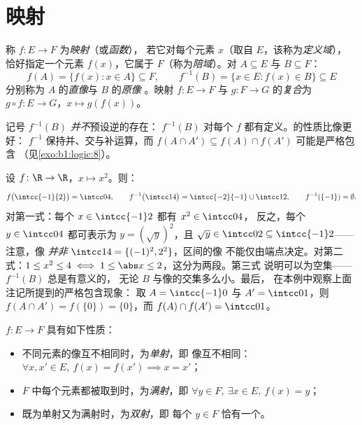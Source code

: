 \section{映射}

\begin{definition}[映射、像、原像]\label{def:b1:logic:map}
称 $f \colon E \to F$ 为\emph{映射}（或\emph{函数}），
若它对每个元素 $x$（取自 $E$，该称为\emph{定义域}），
恰好指定一个元素 $f(x)$，它属于 $F$（称为\emph{陪域}）。对 $A
\subseteq E$ 与 $B \subseteq F$：
\[
f(A) = \{f(x) : x \in A\} \subseteq F,
\qquad
f^{-1}(B) = \{x \in E : f(x) \in B\} \subseteq E
\]
分别称为 $A$ 的\emph{直像}与 $B$ 的\emph{原像}
。映射 $f \colon E \to F$ 与
$g \colon F \to G$ 的\emph{复合}为 $g \circ f \colon E \to G$，$x \mapsto
g(f(x))$。
\end{definition}

\begin{remark}
记号 $f^{-1}(B)$ \emph{并不}预设逆的存在：
$f^{-1}(B)$ 对每个 $f$ 都有定义。的性质比像更好：
$f^{-1}$ 保持并、交与补运算，而
$f(A \cap A') \subseteq f(A) \cap f(A')$ 可能是严格包含
（见\cref{exo:b1:logic:8}）。
\end{remark}

\begin{example}[计算像与原像]\label{ex:b1:logic:images}
设 $f \colon \R \to \R$，$x \mapsto x^2$。则：
\[
f\bigl(\intcc{-1}{2}\bigr) = \intcc04, \qquad
f^{-1}\bigl(\intcc14\bigr) = \intcc{-2}{-1} \cup \intcc12, \qquad
f^{-1}(\{-1\}) = \emptyset .
\]
对第一式：每个 $x \in \intcc{-1}2$ 都有 $x^2 \in \intcc04$，
反之，每个 $y \in \intcc04$ 都可表示为 $y = (\sqrt y)^2$，且 $\sqrt y
\in \intcc02 \subseteq \intcc{-1}2$——注意，像
\emph{并非} $\intcc14 = \{(-1)^2, 2^2\}$，区间的像
不能仅由端点决定。对第二式：$1 \leq x^2 \leq 4 \iff
1 \leq \abs x \leq 2$，这分为两段。第三式
说明可以为空集——$f^{-1}(B)$ 总是有意义的，
无论 $B$ 与像的交集多么小。最后，
在本例中观察上面注记所提到的严格包含现象：
取 $A = \intcc{-1}0$ 与 $A' = \intcc01$，则 $f(A \cap A') =
f(\{0\}) = \{0\}$，而 $f(A) \cap f(A') = \intcc01$。
\end{example}

\begin{definition}[单射、满射、双射]\label{def:b1:logic:inj}
 $f \colon E \to F$ 具有如下性质：
\begin{itemize}
  \item 不同元素的像互不相同时，为\emph{单射}，即
        像互不相同： $\forall x, x' \in E,\ f(x) = f(x') \implies
        x = x'$；
  \item $F$ 中每个元素都被取到时，为\emph{满射}，即
        $\forall y \in F,\ \exists x \in E,\ f(x) = y$；
  \item 既为单射又为满射时，为\emph{双射}，即
        每个 $y \in F$ 恰有一个。
\end{itemize}
\end{definition}

